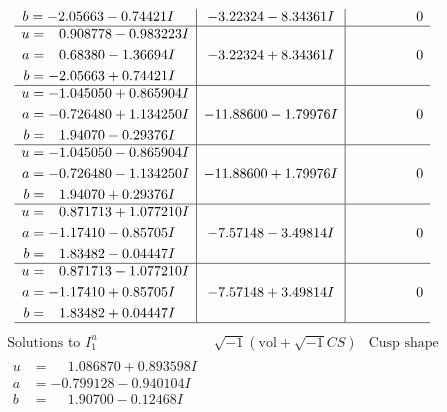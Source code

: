 \documentclass[1p]{elsarticle_modified}
\theoremstyle{definition}
\newcommand{\I}{\sqrt{-1}}
\begin{document}
$$\begin{array}{c|c|c}
\begin{aligned}
b &= -2.05663 - 0.74421 I\end{aligned}
 & -3.22324 - 8.34361 I & \phantom{-0.000000 } 0 \\ \hline\begin{aligned}
u &= \phantom{-}0.908778 - 0.983223 I \\
a &= \phantom{-}0.68380 - 1.36694 I \\
b &= -2.05663 + 0.74421 I\end{aligned}
 & -3.22324 + 8.34361 I & \phantom{-0.000000 } 0 \\ \hline\begin{aligned}
u &= -1.045050 + 0.865904 I \\
a &= -0.726480 + 1.134250 I \\
b &= \phantom{-}1.94070 - 0.29376 I\end{aligned}
 & -11.88600 - 1.79976 I & \phantom{-0.000000 } 0 \\ \hline\begin{aligned}
u &= -1.045050 - 0.865904 I \\
a &= -0.726480 - 1.134250 I \\
b &= \phantom{-}1.94070 + 0.29376 I\end{aligned}
 & -11.88600 + 1.79976 I & \phantom{-0.000000 } 0 \\ \hline\begin{aligned}
u &= \phantom{-}0.871713 + 1.077210 I \\
a &= -1.17410 - 0.85705 I \\
b &= \phantom{-}1.83482 - 0.04447 I\end{aligned}
 & -7.57148 - 3.49814 I & \phantom{-0.000000 } 0 \\ \hline\begin{aligned}
u &= \phantom{-}0.871713 - 1.077210 I \\
a &= -1.17410 + 0.85705 I \\
b &= \phantom{-}1.83482 + 0.04447 I\end{aligned}
 & -7.57148 + 3.49814 I & \phantom{-0.000000 } 0\\
 \hline 
 \end{array}$$\newpage$$\begin{array}{c|c|c}  
\text{Solutions to }I^u_{1}& \I (\text{vol} + \sqrt{-1}CS) & \text{Cusp shape}\\
 \hline 
\begin{aligned}
u &= \phantom{-}1.086870 + 0.893598 I \\
a &= -0.799128 - 0.940104 I \\
b &= \phantom{-}1.90700 - 0.12468 I\end{aligned}

\end{array}$$
\end{document}
